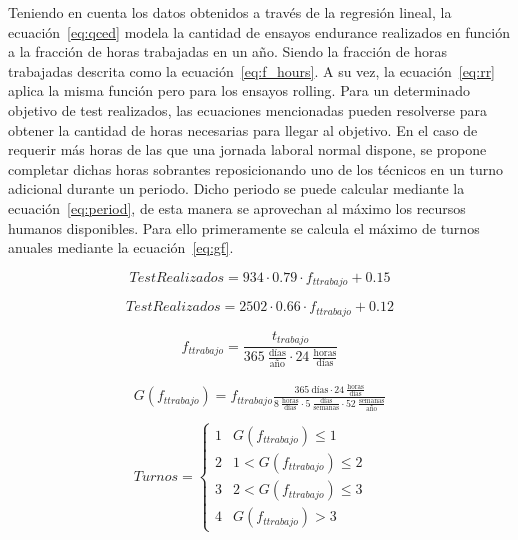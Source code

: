 Teniendo en cuenta los datos obtenidos a través de la regresión lineal,
la ecuación~\ref{eq:qced} modela la cantidad de ensayos endurance
realizados en función a la fracción de horas trabajadas en un año.
Siendo la fracción de horas trabajadas descrita como la ecuación~\ref{eq:f_hours}.
A su vez, la ecuación~\ref{eq:rr} aplica la misma función
pero para los ensayos rolling.
Para un determinado objetivo de test realizados,
las ecuaciones mencionadas pueden resolverse
para obtener la cantidad de horas necesarias para llegar al objetivo.
En el caso de requerir más horas de las que una jornada laboral normal dispone,
se propone completar dichas horas sobrantes
reposicionando uno de los técnicos en un turno adicional durante un periodo.
Dicho periodo se puede calcular mediante la ecuación~\ref{eq:period},
de esta manera se aprovechan al máximo los recursos humanos disponibles.
Para ello primeramente se calcula
el máximo de turnos anuales mediante la ecuación~\ref{eq:gf}.

\begin{equation}
	Test Realizados = 934 \cdot 0.79 \cdot f_{t trabajo} + 0.15
	\label{eq:qced}
\end{equation}

\begin{equation}
	Test Realizados = 2502 \cdot 0.66 \cdot f_{t trabajo} + 0.12
	\label{eq:rr}
\end{equation}

\begin{equation}
	f_{t trabajo}= \frac{t_{trabajo}}{365~\frac{\text{días}}{\text{año}} \cdot
	24~\frac{\text{horas}}{\text{días}}}
	\label{eq:f_hours}
\end{equation}

\begin{equation}
	\begin{array}{c}
		G(f_{t trabajo}) = f_{t trabajo}
		\frac{365~\text{días}
		\cdot 24~\frac{\text{horas}}{\text{días}}}
		{8~\frac{\text{horas}}{\text{días}} \cdot
			5~\frac{\text{días}}{\text{semanas}} \cdot
		52~\frac{\text{semanas}}{\text{año}}} \\
		\\
		Turnos= 
		\begin{cases}
			1	& G(f_{t trabajo}) \leq 1 \\
			2	& 1 < G(f_{t trabajo}) \leq 2 \\
			3	& 2 < G(f_{t trabajo}) \leq 3 \\
			4	& G(f_{t trabajo}) > 3
		\end{cases}
	\end{array}
	\label{eq:gf}
\end{equation}

